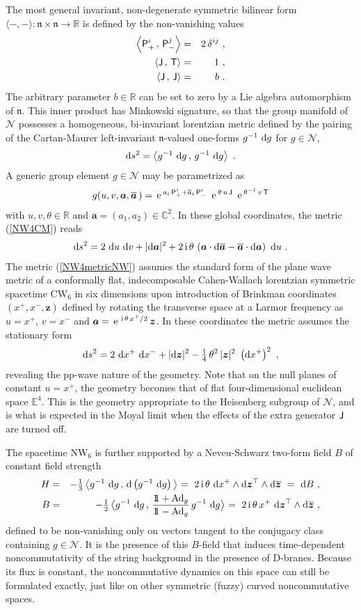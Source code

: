 \documentclass[11pt,a4paper]{article}
\newcommand{\mbf}[1]{{\boldsymbol {#1} }}
\def\ii{{\,{\rm i}\,}}
\def\dd{{\rm d}}
\def\P{{\sf P}}
\def\T{{\sf T}}
\def\J{{\sf J}}
\def\ma{{\mbf a}}
\def\mz{{\mbf z}}
\newcommand{\complex}{{\mathbb C}} %
\newcommand{\real}{{\mathbb R}} %
\newcommand{\eucl}{{\mathbb E}}
\newcommand{\id}{{1\!\!1}} %
\def\nn{\nonumber}
\def\e{{\,\rm e}\,}
\def\bea{\begin{eqnarray}}
\def\eea{\end{eqnarray}}
\newcommand{\beq}{\begin{eqnarray}}
\newcommand{\eeq}{\end{eqnarray}}
\begin{document}
The most general invariant, non-degenerate symmetric bilinear form
$\langle-,-\rangle:\mathfrak{n}\times\mathfrak{n}\to\real$
is defined by the non-vanishing values
\bea
\left\langle\P^i_+\,,\,\P^j_-\right\rangle&=&2\,\delta^{ij} \ , \nn\\
\left\langle\J\,,\,\T\right\rangle&=&1 \ , \nn\\
\left\langle\J\,,\,\J\right\rangle&=&b \ .
\label{NW4innerprod}\eea
The arbitrary parameter $b\in\real$ can be set to zero by a Lie
algebra automorphism of $\mathfrak{n}$. This inner product has
Minkowski signature, so that the
group manifold of $\mathcal N$ possesses a
homogeneous, bi-invariant lorentzian metric defined by the pairing of
the Cartan-Maurer left-invariant $\mathfrak n$-valued one-forms
$g^{-1}~\dd g$ for $g\in\mathcal N$,
\beq
\dd s^2=\left\langle g^{-1}~\dd g\,,\,g^{-1}~\dd g\right\rangle \ .
\label{NW4CM}\eeq
A generic group element $g\in\mathcal N$ may be parametrized as
\beq
g(u,v,\ma,\overline{\ma}\,)=\e^{a_i\,\P^i_++\overline{a}_i
\,\P^i_-}~\e^{\theta\,u\,\J}~\e^{\theta^{-1}\,v\,\T}
\label{NW4coords}\eeq
with $u,v,\theta\in\real$ and $\ma=(a_1,a_2)\in\complex^2$. In these
global coordinates, the metric (\ref{NW4CM}) reads
\beq
\dd s^2=2~\dd u~\dd v+|\dd\ma|^2+2\ii\theta\,\left(\ma\cdot
\dd\overline{\ma}-\overline{\ma}\cdot\dd\ma\right)~\dd u \ .
\label{NW4metricNW}\eeq
The metric (\ref{NW4metricNW}) assumes the standard form of the plane
wave metric of a conformally flat, indecomposable Cahen-Wallach
lorentzian symmetric spacetime CW$_6$ in six dimensions upon
introduction of Brinkman coordinates $(x^+,x^-,\mz)$ defined by
rotating the transverse space at a Larmor frequency as $u=x^+$,
$v=x^-$ and $\ma=\e^{\ii\theta\,x^+/2}\,\mz$. In these coordinates the
metric assumes the stationary form
\beq
\dd s^2=2~\dd x^+~\dd x^-+|\dd\mz|^2-\mbox{$\frac14$}\,\theta^2\,|\mz|^2~
\left(\dd x^+\right)^2 \ ,
\label{NW4metricBrink}\eeq
revealing the pp-wave nature of the geometry. Note
that on the null planes of constant $u=x^+$, the geometry becomes that of
flat four-dimensional euclidean space $\eucl^4$. This is the geometry
appropriate to the Heisenberg subgroup of $\mathcal{N}$, and is what
is expected in the Moyal limit when the effects of the extra generator
$\J$ are turned off.

The spacetime NW$_6$ is further supported by a Neveu-Schwarz two-form
field $B$ of constant field strength
\bea
H&=&-\mbox{$\frac13$}\,\bigl\langle g^{-1}~\dd g\,,\,\dd
\left(g^{-1}~\dd g\right)\bigl\rangle
~=~2\ii\theta~\dd x^+\wedge\dd\mz^\top\wedge\dd\overline{\mz}
~=~\dd B \ , \nn\\
B&=&-\mbox{$\frac12$}\,\bigl\langle g^{-1}~\dd g\,,\,
\frac{\id+{\rm Ad}_g}{\id-{\rm Ad}_g}\,g^{-1}~\dd g\bigl\rangle~=~
2\ii\theta\,x^+~\dd\mz^\top\wedge\dd\overline{\mz} \ ,
\label{NS2formBrink}\eea
defined to be non-vanishing only on vectors tangent to the conjugacy
class containing $g\in\mathcal{N}$. It is the presence of
this $B$-field that induces time-dependent noncommutativity of the
string background in the presence of D-branes. Because its flux is
constant, the noncommutative dynamics on this space can still be
formulated exactly, just like on other symmetric (fuzzy) curved
noncommutative spaces.
\end{document}
